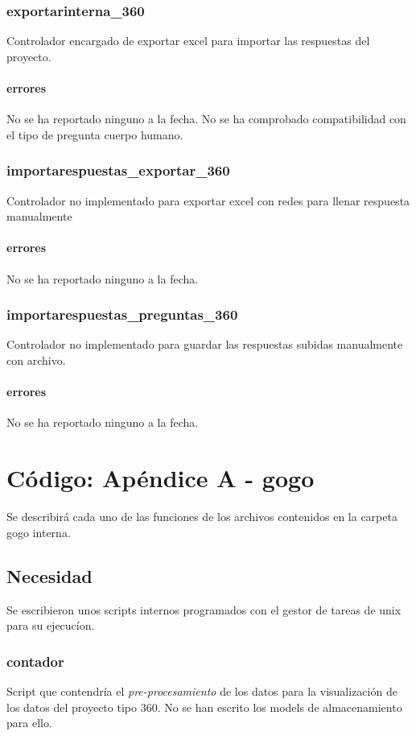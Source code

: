 \documentclass[10pt,a4paper]{book}
\begin{document}
	\subsection{exportarinterna\_360}
	Controlador encargado de exportar excel para importar las respuestas del proyecto.
	\subsubsection{errores}
	No se ha reportado ninguno a la fecha. No se ha comprobado compatibilidad con el tipo de pregunta cuerpo humano.
	
	\subsection{importarespuestas\_exportar\_360}
	Controlador no implementado para exportar excel con redes para llenar respuesta manualmente
	\subsubsection{errores}
	No se ha reportado ninguno a la fecha.
	
	\subsection{importarespuestas\_preguntas\_360}
	Controlador no implementado para guardar las respuestas subidas manualmente con archivo. 
	\subsubsection{errores}
	No se ha reportado ninguno a la fecha.
	
	
	
	\chapter{Código: Apéndice A - gogo}
	
	Se describirá cada uno de las funciones de los archivos contenidos en la carpeta gogo interna.
	
	\section{Necesidad}
	
	Se escribieron unos scripts internos programados con el gestor de tareas de unix para su ejecucíon.
	
	\subsection{contador}
	Script que contendría el \textit{pre-procesamiento} de los datos para la visualización de los datos del proyecto tipo 360. No se han escrito los models de almacenamiento para ello.
\end{document}
